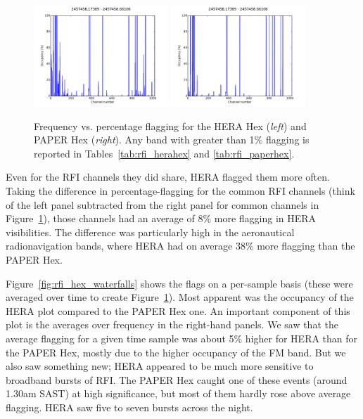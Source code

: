 \begin{figure}[h!]
\centering
\includegraphics[width=0.45\textwidth]{chapters/data_processing/figures/RFI_HH_spec.pdf}
\includegraphics[width=0.45\textwidth]{chapters/data_processing/figures/RFI_PH_spec.pdf}
\caption[Frequency vs. percentage flagging for the HERA Hex and PAPER Hex.]{Frequency vs. percentage flagging for the HERA Hex (\textit{left}) and PAPER Hex (\textit{right}). Any band with greater than 1\% flagging is reported in Tables~\ref{tab:rfi_herahex} and \ref{tab:rfi_paperhex}.}
\label{fig:rfi_spec_hex_comparison}
\end{figure}

Even for the RFI channels they did share, HERA flagged them more often. Taking the difference in percentage-flagging for the common RFI channels (think of the left panel subtracted from the right panel for common channels in Figure~\ref{fig:rfi_spec_hex_comparison}), those channels had an average of 8\% more flagging in HERA visibilities. The difference was particularly high in the aeronautical radionavigation bands, where HERA had on average 38\% more flagging than the PAPER Hex.

Figure~\ref{fig:rfi_hex_waterfalls} shows the flags on a per-sample basis (these were averaged over time to create Figure~\ref{fig:rfi_spec_hex_comparison}). Most apparent was the occupancy of the HERA plot compared to the PAPER Hex one. An important component of this plot is the averages over frequency in the right-hand panels. We saw that the average flagging for a given time sample was about 5\% higher for HERA than for the PAPER Hex, mostly due to the higher occupancy of the FM band. But we also saw something new; HERA appeared to be much more sensitive to broadband bursts of RFI. The PAPER Hex caught one of these events (around 1.30am SAST) at high significance, but most of them hardly rose above average flagging. HERA saw five to seven bursts across the night. 


